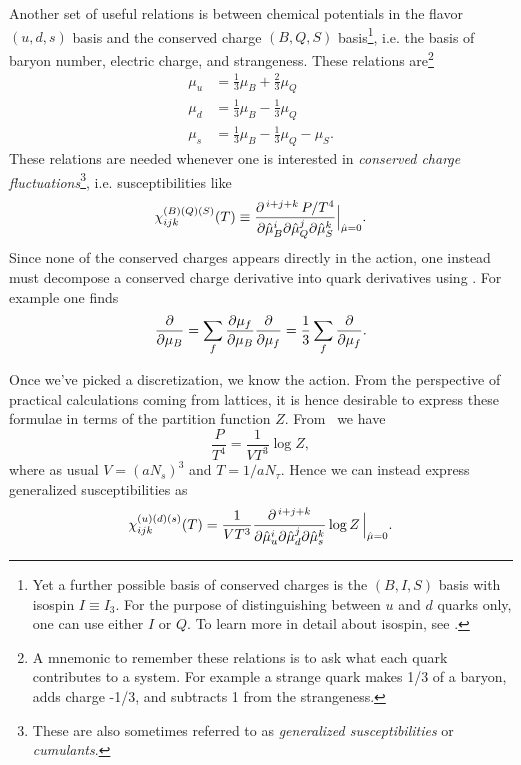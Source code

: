 Another set of useful relations is between chemical potentials in the flavor
$(u,d,s)$ basis and the conserved charge $(B,Q,S)$ basis\footnote{Yet a further
possible basis of conserved charges is the $(B,I,S)$ basis with isospin $I\equiv I_3$.
For the purpose of distinguishing between $u$ and $d$ quarks only, one can use
either $I$ or $Q$.
To learn more in detail about isospin, see .}, i.e. the basis
of baryon number, electric charge, and strangeness. These relations 
are\footnote{A mnemonic to remember these relations is to ask what each quark
contributes to a system. For example a strange quark makes 1/3 of a baryon,
adds charge -1/3, and subtracts 1 from the strangeness.}
\begin{equation}\begin{aligned}\label{eq:quark-conservedCharge}
  \mu_u &= \frac{1}{3}\mu_B + \frac{2}{3}\mu_Q\\
  \mu_d &= \frac{1}{3}\mu_B - \frac{1}{3}\mu_Q\\
  \mu_s &= \frac{1}{3}\mu_B - \frac{1}{3}\mu_Q - \mu_S.
\end{aligned}\end{equation}
These relations are needed whenever one is interested in {\it conserved
charge fluctuations}\footnote{These are also sometimes referred to
as {\it generalized susceptibilities}
or {\it cumulants}.}, 
i.e. susceptibilities like
\begin{equation}
\chi_{ijk}^{(B)(Q)(S)}(T)
  \equiv\frac{\partial^{\,i+j+k}\,P/T^4}{\partial\hat{\mu}_B^i\partial\hat{\mu}_Q^j
                                       \partial\hat{\mu}_S^k}\Big|_{\hat{\mu}=0}.
\end{equation}
Since none of the conserved charges appears directly in the action, one
instead must decompose a conserved charge derivative into quark derivatives
using . For example 
one finds
\begin{equation}
  \pdv{\mu_B}
   =\sum_f\pdv{\mu_f}{\mu_B}\pdv{\mu_f}
   =\frac{1}{3}\sum_f\pdv{\mu_f}.
\end{equation}

Once we've picked a discretization, we know the action. From the perspective of
practical calculations coming from lattices, it is hence desirable to express
these formulae in terms of the partition function $Z$. From~
we have
\begin{equation}
  \frac{P}{T^4}=\frac{1}{VT^3}\log Z,
\end{equation}
where as usual $V=(aN_s)^3$ and $T=1/aN_\tau$.
Hence we can instead
express generalized susceptibilities as
\begin{equation}
\chi_{ijk}^{(u)(d)(s)}(T)
  =\frac{1}{VT^3}\frac{\partial^{\,i+j+k}}{\partial\hat{\mu}_u^i\partial\hat{\mu}_d^j
                                       \partial\hat{\mu}_s^k}\log Z\,\Big|_{\hat{\mu}=0}.
\end{equation}

